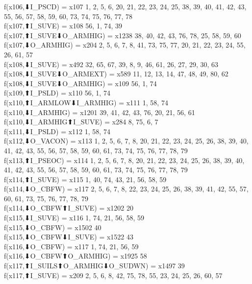 f(x106,⬇I_PSCD) = x107 {1, 2, 5, 6, 20, 21, 22, 23, 24, 25, 38, 39, 40, 41, 42, 43, 55, 56, 57, 58, 59, 60, 73, 74, 75, 76, 77, 78} \\
f(x107,⬆I_SUVE) = x108 {56, 1, 74, 39} \\
f(x107,⬆I_SUVE⬇O_ARMHIG) = x1238 {38, 40, 42, 43, 76, 78, 25, 58, 59, 60} \\
f(x107,⬇O_ARMHIG) = x204 {2, 5, 6, 7, 8, 41, 73, 75, 77, 20, 21, 22, 23, 24, 55, 26, 61, 57} \\
f(x108,⬇I_SUVE) = x492 {32, 65, 67, 39, 8, 9, 46, 61, 26, 27, 29, 30, 63} \\
f(x108,⬇I_SUVE⬇O_ARMEXT) = x589 {11, 12, 13, 14, 47, 48, 49, 80, 62} \\
f(x108,⬇I_SUVE⬇O_ARMHIG) = x109 {56, 1, 74} \\
f(x109,⬆I_PSLD) = x110 {56, 1, 74} \\
f(x110,⬆I_ARMLOW⬇I_ARMHIG) = x111 {1, 58, 74} \\
f(x110,⬇I_ARMHIG) = x1201 {39, 41, 42, 43, 76, 20, 21, 56, 61} \\
f(x110,⬇I_ARMHIG⬆I_SUVE) = x284 {8, 75, 6, 7} \\
f(x111,⬇I_PSLD) = x112 {1, 58, 74} \\
f(x112,⬇O_VACON) = x113 {1, 2, 5, 6, 7, 8, 20, 21, 22, 23, 24, 25, 26, 38, 39, 40, 41, 42, 43, 55, 56, 57, 58, 59, 60, 61, 73, 74, 75, 76, 77, 78, 79} \\
f(x113,⬆I_PSEOC) = x114 {1, 2, 5, 6, 7, 8, 20, 21, 22, 23, 24, 25, 26, 38, 39, 40, 41, 42, 43, 55, 56, 57, 58, 59, 60, 61, 73, 74, 75, 76, 77, 78, 79} \\
f(x114,⬆I_SUVE) = x115 {1, 40, 74, 43, 21, 56, 58, 59} \\
f(x114,⬇O_CBFW) = x117 {2, 5, 6, 7, 8, 22, 23, 24, 25, 26, 38, 39, 41, 42, 55, 57, 60, 61, 73, 75, 76, 77, 78, 79} \\
f(x114,⬇O_CBFW⬆I_SUVE) = x1202 {20} \\
f(x115,⬇I_SUVE) = x116 {1, 74, 21, 56, 58, 59} \\
f(x115,⬇O_CBFW) = x1502 {40} \\
f(x115,⬇O_CBFW⬇I_SUVE) = x1522 {43} \\
f(x116,⬇O_CBFW) = x117 {1, 74, 21, 56, 59} \\
f(x116,⬇O_CBFW⬆O_ARMHIG) = x1925 {58} \\
f(x117,⬆I_SUILS⬆O_ARMHIG⬇O_SUDWN) = x1497 {39} \\
f(x117,⬆I_SUVE) = x209 {2, 5, 6, 8, 42, 75, 78, 55, 23, 24, 25, 26, 60, 57} \\
